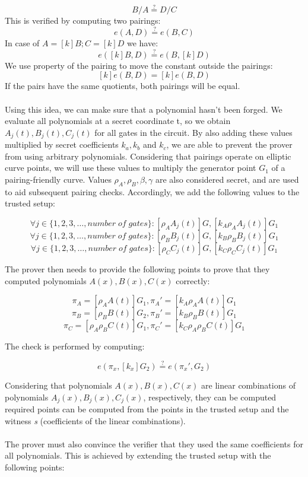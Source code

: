 $$ B / A \stackrel{?}{=} D / C $$
This is verified by computing two pairings:
$$ e(A, D) \stackrel{?}{=} e(B, C) $$
In case of $A = [k]B; C = [k]D$ we have:
$$ e([k]B, D) \stackrel{?}{=} e(B, [k]D)$$
We use property of the pairing to move the constant outside the pairings:
$$ [k]e(B, D) = [k]e(B, D) $$
If the pairs have the same quotients, both pairings will be equal.\\
\\
Using this idea, we can make sure that a polynomial hasn't been forged. We evaluate all polynomials at a secret coordinate t, so we obtain $A_j(t), B_j(t), C_j(t)$ for all gates in the circuit. By also adding these values multiplied by secret coefficients $k_a, k_b$ and $k_c$, we are able to prevent the prover from using arbitrary polynomials. Considering that pairings operate on elliptic curve points, we will use these values to multiply the generator point $G_1$ of a pairing-friendly curve. Values $\rho_A, \rho_B, \beta, \gamma$ are also considered secret, and are used to aid subsequent pairing checks. Accordingly, we add the following values to the trusted setup:

$$\forall j \in \{1, 2, 3, \ldots, number\;of\;gates\} : [\rho_A A_j(t)]G, [k_A \rho_A A_j(t)]G_1 $$
$$\forall j \in \{1, 2, 3, \ldots, number\;of\;gates\} : [\rho_B B_j(t)]G, [k_B \rho_B B_j(t)]G_1 $$ 
$$\forall j \in \{1, 2, 3, \ldots, number\;of\;gates\} : [\rho_C C_j(t)]G, [k_C \rho_C C_j(t)]G_1 $$ 

The prover then needs to provide the following points to prove that they computed polynomials $A(x), B(x), C(x)$ correctly:

$$\pi_A = [\rho_A A(t)]G_1, \pi_A' = [k_A \rho_A A(t)]G_1$$
$$\pi_B = [\rho_B B(t)]G_2, \pi_B' = [k_B \rho_B B(t)]G_1$$
$$\pi_C = [\rho_A \rho_B C(t)]G_1, \pi_C' = [k_C \rho_A \rho_B C(t)]G_1$$

The check is performed by computing:

$$ e(\pi_x, [k_x]G_2) \stackrel{?}{=} e(\pi_x', G_2) $$

Considering that polynomials $A(x), B(x), C(x)$ are linear combinations of polynomials $A_j(x), B_j(x), C_j(x)$, respectively, they can be computed required points can be computed from the points in the trusted setup and the witness \textit{s} (coefficients of the linear combinations).\\
\\
The prover must also convince the verifier that they used the same coefficients for all polynomials. This is achieved by extending the trusted setup with the following points:

